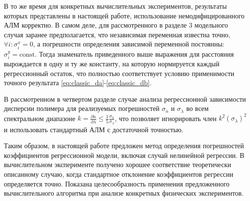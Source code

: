 \documentclass[11pt,a4paper]{article}
\theoremstyle{definition}
\begin{document}
\begin{enumerate}
	В то же время для конкретных вычислительных экспериментов, результаты которых
	представлены в настоящей работе, использование немодифицированного АЛМ корректно.
	В самом деле, для рассмотренного в разделе 3 модельного случая заранее
	предполагается, что независимая переменная известна точно,
	$\forall i : \sigma^x_i = 0$, а погрешности определения зависимой переменной
	постоянны: $\sigma^y_i = \text{const}$. Тогда знаменатель приведенного выше выражения
	для расстояния вырождается в одну и ту же константу, на которую нормируется каждый
	регрессионный остаток, что полностью соответствует условию применимости
	точного результата \eqref{eq:classic_da}-\eqref{eq:classic_db}.

	В рассмотренном в четвертом разделе случае анализа регрессионной
	зависимости дисперсии полимера для реализуемых погрешностей
	$\sigma_n$ и $\sigma_{\lambda}$ во всем спектральном диапазоне
	$k = \frac{\partial n}{\partial \lambda} \leq \frac{1}{5} \frac{\sigma_n}{\sigma_{\lambda}}$,
	что позволяет игнорировать член $k^2 (\sigma_{\lambda})^2$ и использовать
	стандартный АЛМ с достаточной точностью.
\end{enumerate}

Таким образом, в настоящей работе предложен метод определения
погрешностей коэффициентов регрессионной модели, включая случай нелинейной регрессии. В
вычислительном эксперименте получено хорошее соответствие теоретически описанному случаю, когда
стандартное отклонение коэффициентов регрессии определяется точно.
Показана целесообразность применения предложенного вычислительного
алгоритма при анализе конкретных физических экспериментов.

\FloatBarrier


%
%

\end{document}

